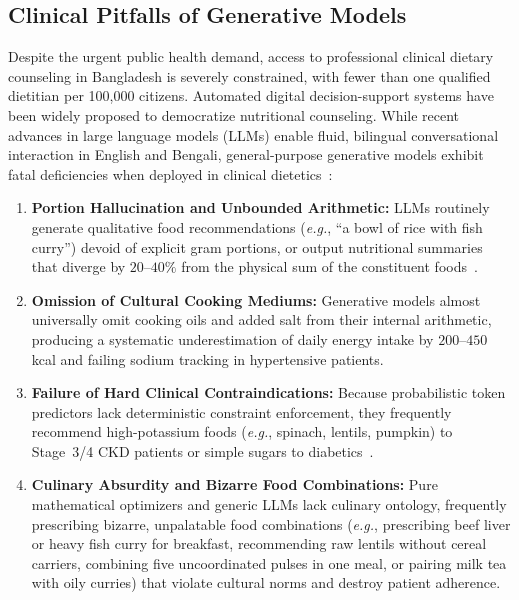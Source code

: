 \documentclass[5p,times,twocolumn]{elsarticle}
\newcommand{\eg}{\textit{e.g.}}
\begin{document}
\subsection{Clinical Pitfalls of Generative Models}
Despite the urgent public health demand, access to professional clinical dietary counseling in Bangladesh is severely constrained, with fewer than one qualified dietitian per 100,000 citizens. Automated digital decision-support systems have been widely proposed to democratize nutritional counseling. While recent advances in large language models (LLMs) enable fluid, bilingual conversational interaction in English and Bengali, general-purpose generative models exhibit fatal deficiencies when deployed in clinical dietetics~\cite{wang2025ai, zhou2026nutrirag}:
\begin{enumerate}[leftmargin=*,itemsep=1.5pt]
  \item \textbf{Portion Hallucination and Unbounded Arithmetic:} LLMs routinely generate qualitative food recommendations (\eg{}, ``a bowl of rice with fish curry'') devoid of explicit gram portions, or output nutritional summaries that diverge by $20$--$40\%$ from the physical sum of the constituent foods~\cite{wang2025ai}.
  \item \textbf{Omission of Cultural Cooking Mediums:} Generative models almost universally omit cooking oils and added salt from their internal arithmetic, producing a systematic underestimation of daily energy intake by $200$--$450$\,kcal and failing sodium tracking in hypertensive patients.
  \item \textbf{Failure of Hard Clinical Contraindications:} Because probabilistic token predictors lack deterministic constraint enforcement, they frequently recommend high-potassium foods (\eg{}, spinach, lentils, pumpkin) to Stage~3/4 CKD patients or simple sugars to diabetics~\cite{miao2024clinical}.
  \item \textbf{Culinary Absurdity and Bizarre Food Combinations:} Pure mathematical optimizers and generic LLMs lack culinary ontology, frequently prescribing bizarre, unpalatable food combinations (\eg{}, prescribing beef liver or heavy fish curry for breakfast, recommending raw lentils without cereal carriers, combining five uncoordinated pulses in one meal, or pairing milk tea with oily curries) that violate cultural norms and destroy patient adherence.
\end{enumerate}
\end{document}
